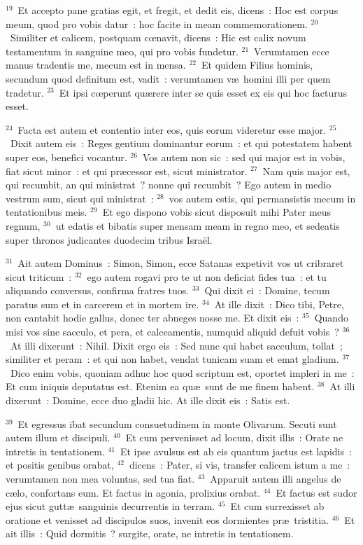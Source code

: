 ${}^{19}$~Et accepto pane gratias egit, et fregit, et dedit eis, dicens~: Hoc est corpus meum, quod pro vobis datur~: hoc facite in meam commemorationem.
${}^{20}$~Similiter et calicem, postquam cœnavit, dicens~: Hic est calix novum testamentum in sanguine meo, qui pro vobis fundetur.
${}^{21}$~Verumtamen ecce manus tradentis me, mecum est in mensa.
${}^{22}$~Et quidem Filius hominis, secundum quod definitum est, vadit~: verumtamen v\ae\ homini illi per quem tradetur.
${}^{23}$~Et ipsi cœperunt qu\ae rere inter se quis esset ex eis qui hoc facturus esset.


${}^{24}$~Facta est autem et contentio inter eos, quis eorum videretur esse major.
${}^{25}$~Dixit autem eis~: Reges gentium dominantur eorum~: et qui potestatem habent super eos, benefici vocantur.
${}^{26}$~Vos autem non sic~: sed qui major est in vobis, fiat sicut minor~: et qui pr\ae cessor est, sicut ministrator.
${}^{27}$~Nam quis major est, qui recumbit, an qui ministrat~? nonne qui recumbit~? Ego autem in medio vestrum sum, sicut qui ministrat~:
${}^{28}$~vos autem estis, qui permansistis mecum in tentationibus meis.
${}^{29}$~Et ego dispono vobis sicut disposuit mihi Pater meus regnum,
${}^{30}$~ut edatis et bibatis super mensam meam in regno meo, et sedeatis super thronos judicantes duodecim tribus Isra\"el.


${}^{31}$~Ait autem Dominus~: Simon, Simon, ecce Satanas expetivit vos ut cribraret sicut triticum~:
${}^{32}$~ego autem rogavi pro te ut non deficiat fides tua~: et tu aliquando conversus, confirma fratres tuos.
${}^{33}$~Qui dixit ei~: Domine, tecum paratus sum et in carcerem et in mortem ire.
${}^{34}$~At ille dixit~: Dico tibi, Petre, non cantabit hodie gallus, donec ter abneges nosse me. Et dixit eis~:
${}^{35}$~Quando misi vos sine sacculo, et pera, et calceamentis, numquid aliquid defuit vobis~?
${}^{36}$~At illi dixerunt~: Nihil. Dixit ergo eis~: Sed nunc qui habet sacculum, tollat~; similiter et peram~: et qui non habet, vendat tunicam suam et emat gladium.
${}^{37}$~Dico enim vobis, quoniam adhuc hoc quod scriptum est, oportet impleri in me~: Et cum iniquis deputatus est. Etenim ea qu\ae\ sunt de me finem habent.
${}^{38}$~At illi dixerunt~: Domine, ecce duo gladii hic. At ille dixit eis~: Satis est.


${}^{39}$~Et egressus ibat secundum consuetudinem in monte Olivarum. Secuti sunt autem illum et discipuli.
${}^{40}$~Et cum pervenisset ad locum, dixit illis~: Orate ne intretis in tentationem.
${}^{41}$~Et ipse avulsus est ab eis quantum jactus est lapidis~: et positis genibus orabat,
${}^{42}$~dicens~: Pater, si vis, transfer calicem istum a me~: verumtamen non mea voluntas, sed tua fiat.
${}^{43}$~Apparuit autem illi angelus de c\ae lo, confortans eum. Et factus in agonia, prolixius orabat.
${}^{44}$~Et factus est sudor ejus sicut gutt\ae\ sanguinis decurrentis in terram.
${}^{45}$~Et cum surrexisset ab oratione et venisset ad discipulos suos, invenit eos dormientes pr\ae\ tristitia.
${}^{46}$~Et ait illis~: Quid dormitis~? surgite, orate, ne intretis in tentationem.


